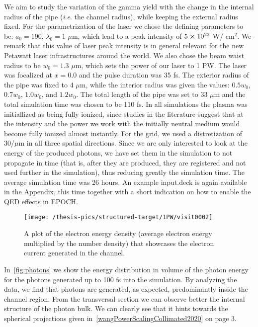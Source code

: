 \documentclass[12pt, class=report, crop=false]{standalone}
\begin{document}
We aim to study the variation of the gamma yield
with the change in the internal radius of the pipe
(\textit{i}.\textit{e}. the channel radius), while keeping the
external radius fixed. For the parametrization of the laser we chose
the defining parameters to be: \(a_0 = 190\), \(\lambda_0 = 1\)
\(\mu\)m, which lead to a peak intensity of \(5\cp10^{22}\) W/
cm\(^{2}\). We remark that this value of laser peak intensity is in
general relevant for the new Petawatt laser infrastructures around
the world. We also chose the beam waist radius to be \(w_0 = 1.3\)
\(\mu\)m, which sets the power of our laser to 1 PW. The laser was
focalized at \(x = 0.0\) and the pulse duration was 35 fs. The
exterior radius of the pipe was fixed to 4 \(\mu\)m, while the
interior radius was given the values: \(0.5w_0\), \(0.7w_0\),
\(1.0w_0\), and \(1.2w_0\). The total length of the pipe was set to
33 \(\mu\)m and the total simulation time was chosen to be 110 fs.
In all simulations the plasma was initiallized as being fully
ionized, since studies in the literature suggest that at the
intensity and the power we work with the initially neutral medium
would become fully ionized almost instantly. For the grid,
we used a distretization of 30/\(\mu\)m in all three spatial
directions. Since we are only interested to look
at the energy of the produced photons, we have set them in the
simulation to not propagate in time (that is, after they are
produced, they are registered and not used further in the simulation),
thus reducing greatly the simulation time. The average simulation time
was 26 hours. An example input.deck is again available in the Appendix, this time together with a short indication on how to enable the QED effects in EPOCH.

\begin{figure}[!h]
  \centering
  \texttt{[image: /thesis-pics/structured-target/1PW/visit0002]}%
  \caption{A plot of the electron energy density (average electron energy multiplied by the number density) that showcases the electron current generated in the channel.}
  \label{fig:electron-current}%
\end{figure}

In~\cref{fig:photons} we show the energy distribution in volume of the photon energy for the photons generated up to 100 fs into the simulation. By analyzing the data, we find that photons are generated, as expected, predominantly inside the channel region. From the transversal section we can observe better the internal structure of the photon bulk. We can clearly see that it hints towards the spherical projections given in~\cref{wangPowerScalingCollimated2020} on page 3.
\end{document}
